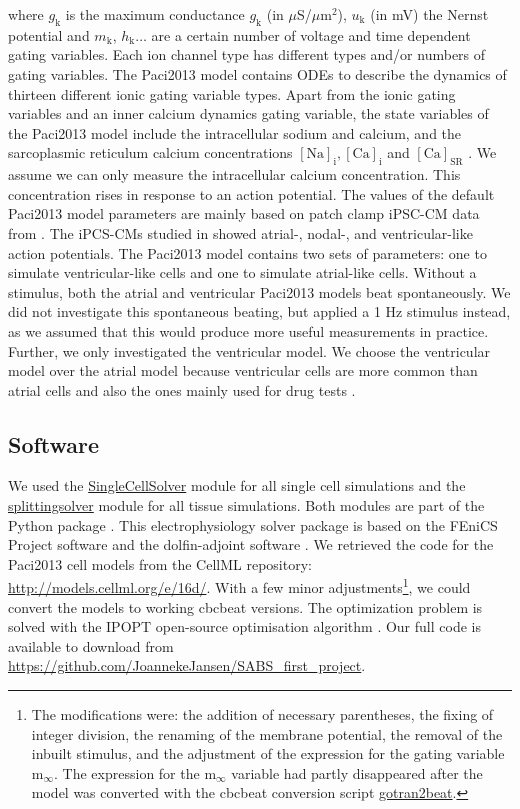 \documentclass{article}
\begin{document}
where $g_{\mathrm{k}}$ is the maximum conductance $g_{\mathrm{k}}$ (in $\mu$S/$\mu$m$^2$), $u_{\mathrm{k}}$ (in mV) the Nernst potential and $m_{\mathrm{k}}$, $h_{\mathrm{k}} \ldots$ are a certain number of voltage and time dependent gating variables. Each ion channel type has different types and/or numbers of gating variables. The Paci2013 model contains ODEs to describe the dynamics of thirteen different ionic gating variable types. Apart from the ionic gating variables and an inner calcium dynamics gating variable, the state variables of the Paci2013 model include the intracellular sodium and calcium, and the sarcoplasmic reticulum calcium concentrations $[\mathrm{Na}]_\mathrm{i}, [\mathrm{Ca}]_{\mathrm{i}}$ and $[\mathrm{Ca}]_{\mathrm{SR}}$ \cite{Paci2013}. We assume we can only measure the intracellular calcium concentration. This concentration rises in response to an action potential. The values of the default Paci2013 model parameters are mainly based on patch clamp iPSC-CM data from \cite{Ma2011}. The iPCS-CMs studied in \cite{Ma2011} showed atrial-, nodal-, and ventricular-like action potentials. The Paci2013 model contains two sets of parameters: one to simulate ventricular-like cells and one to simulate atrial-like cells. Without a stimulus, both the atrial and ventricular Paci2013 models beat spontaneously. We did not investigate this spontaneous beating, but applied a 1 Hz stimulus instead, as we assumed that this would produce more useful measurements in practice. Further, we only investigated the ventricular model. We choose the ventricular model over the atrial model because ventricular cells are more common than atrial cells and also the ones mainly used for drug tests \cite{Paci2015}.
\subsection{Software} \label{Software}
We used the \url{SingleCellSolver} module for all single cell simulations and the \url{splittingsolver} module for all tissue simulations. Both modules are part of the Python package \cite{cbcbeat}. This electrophysiology solver package is based on the FEniCS Project software \cite{fenics} and the dolfin-adjoint software \cite{dolfin-adjoint}. We retrieved the code for the Paci2013 cell models from the CellML repository: \url{http://models.cellml.org/e/16d/}. With a few minor adjustments\footnote{The modifications were: the addition of necessary parentheses, the fixing of integer division, the renaming of the membrane potential, the removal of the inbuilt stimulus, and the adjustment of the expression for the gating variable $\mathrm{m_{\infty}}$. The expression for the $\mathrm{m_{\infty}}$ variable had partly disappeared after the model was converted with the cbcbeat conversion script \url{gotran2beat}.}, we could convert the models to working cbcbeat versions. 
The optimization problem is solved with the IPOPT open-source optimisation algorithm \cite{Wachter2006}. Our full code is available to download from \url{https://github.com/JoannekeJansen/SABS_first_project}.
\end{document}
